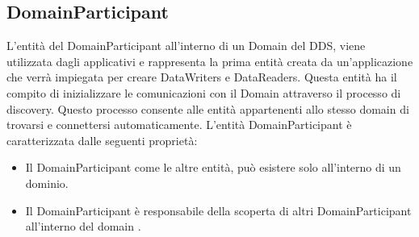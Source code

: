 
\subsection{DomainParticipant}
L'entità del DomainParticipant all'interno di un Domain del DDS,
viene utilizzata dagli applicativi e 
rappresenta la prima entità creata da un'applicazione che verrà 
impiegata per creare DataWriters e DataReaders. 
Questa entità ha il compito di inizializzare
le comunicazioni con il Domain attraverso 
il processo di discovery.
Questo processo consente alle entità appartenenti allo 
stesso domain di trovarsi e connettersi automaticamente.
L'entità DomainParticipant è caratterizzata dalle seguenti proprietà:
\begin{itemize}
    \item Il DomainParticipant come le altre entità, può 
    esistere solo all'interno di un dominio.
    \item Il DomainParticipant è responsabile della scoperta di altri
    DomainParticipant all'interno del domain \cite{domainparticipantrti}.
\end{itemize}


